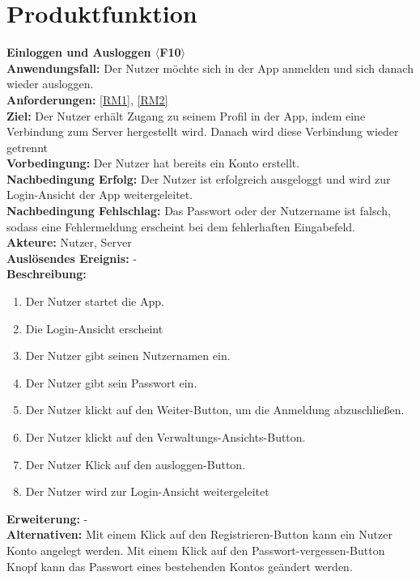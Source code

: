 \documentclass[parskip=full]{scrartcl}
\begin{document}
\section{Produktfunktion}
\textbf{Einloggen und Ausloggen $\langle$F10$\rangle$}\\
\textbf{Anwendungsfall:} Der Nutzer möchte sich in der App anmelden und sich danach wieder ausloggen.\\
\textbf{Anforderungen:} \ref{RM1}, \ref{RM2}\\
\textbf{Ziel:} Der Nutzer erhält Zugang zu seinem Profil in der App, indem eine Verbindung zum Server hergestellt wird. Danach wird diese Verbindung wieder getrennt\\
\textbf{Vorbedingung:} Der Nutzer hat bereits ein Konto erstellt.\\
\textbf{Nachbedingung Erfolg:} Der Nutzer ist erfolgreich ausgeloggt und wird zur Login-Ansicht der App weitergeleitet.\\
\textbf{Nachbedingung Fehlschlag:} Das Passwort oder der Nutzername ist falsch, sodass eine Fehlermeldung erscheint bei dem fehlerhaften Eingabefeld.\\
\textbf{Akteure:} Nutzer, Server\\
\textbf{Auslösendes Ereignis:} -\\
\textbf{Beschreibung:}
\begin{enumerate}
    \item Der Nutzer startet die App.
    \item Die Login-Ansicht erscheint
    \item Der Nutzer gibt seinen Nutzernamen ein.
    \item Der Nutzer gibt sein Passwort ein.
    \item Der Nutzer klickt auf den Weiter-Button, um die Anmeldung abzuschließen.
    \item Der Nutzer klickt auf den Verwaltungs-Ansichts-Button.
    \item Der Nutzer Klick auf den ausloggen-Button.
    \item Der Nutzer wird zur Login-Ansicht weitergeleitet
\end{enumerate}
\textbf{Erweiterung:} -\\
\textbf{Alternativen:} Mit einem Klick auf den Registrieren-Button kann ein Nutzer Konto angelegt werden. Mit einem Klick auf den Passwort-vergessen-Button Knopf kann das Passwort eines bestehenden Kontos geändert werden.  \\
\newpage
\end{document}

